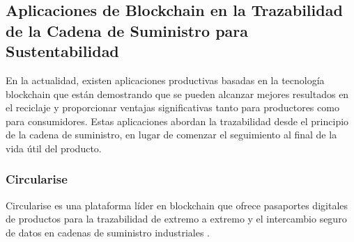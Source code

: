 \documentclass[main.tex]{subfiles}
\begin{document}
\subsection{Aplicaciones de Blockchain en la Trazabilidad de la Cadena de Suministro para Sustentabilidad}

En la actualidad, existen aplicaciones productivas basadas en la tecnología blockchain que están demostrando que se pueden alcanzar mejores resultados en el reciclaje y proporcionar ventajas significativas tanto para productores como para consumidores. Estas aplicaciones abordan la trazabilidad desde el principio de la cadena de suministro, en lugar de comenzar el seguimiento al final de la vida útil del producto.

\subsubsection{Circularise}
Circularise es una plataforma líder en blockchain que ofrece pasaportes digitales de productos para la trazabilidad de extremo a extremo y el intercambio seguro de datos en cadenas de suministro industriales \cite{circularise2024}.
\end{document}
